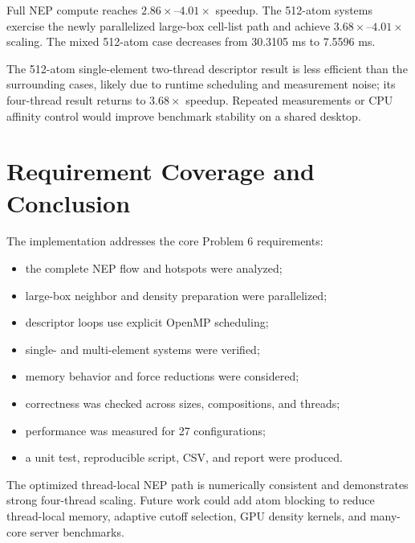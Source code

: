 \documentclass[11pt]{article}
\begin{document}
Full NEP compute reaches $2.86\times$--$4.01\times$ speedup. The 512-atom
systems exercise the newly parallelized large-box cell-list path and achieve
$3.68\times$--$4.01\times$ scaling. The mixed 512-atom case decreases from
30.3105 ms to 7.5596 ms.

The 512-atom single-element two-thread descriptor result is less efficient than
the surrounding cases, likely due to runtime scheduling and measurement noise;
its four-thread result returns to $3.68\times$ speedup. Repeated measurements
or CPU affinity control would improve benchmark stability on a shared desktop.

\section{Requirement Coverage and Conclusion}
The implementation addresses the core Problem 6 requirements:
\begin{itemize}
  \item the complete NEP flow and hotspots were analyzed;
  \item large-box neighbor and density preparation were parallelized;
  \item descriptor loops use explicit OpenMP scheduling;
  \item single- and multi-element systems were verified;
  \item memory behavior and force reductions were considered;
  \item correctness was checked across sizes, compositions, and threads;
  \item performance was measured for 27 configurations;
  \item a unit test, reproducible script, CSV, and report were produced.
\end{itemize}

The optimized thread-local NEP path is numerically consistent and demonstrates
strong four-thread scaling. Future work could add atom blocking to reduce
thread-local memory, adaptive cutoff selection, GPU density kernels, and
many-core server benchmarks.
\end{document}
